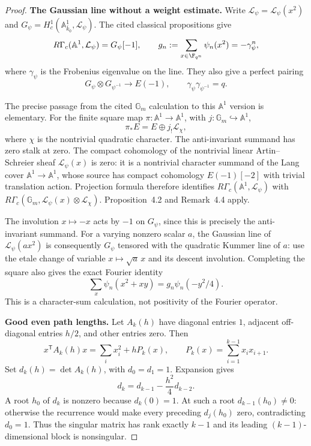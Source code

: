 \documentclass[11pt,a4paper]{article}
\newcommand{\A}{\mathbb A}\newcommand{\PP}{\mathbb P}\newcommand{\GL}{\mathrm{GL}}
\newcommand{\mathscr}{\mathcal}
\theoremstyle{named}\newtheorem{finding}{Finding}[section]
\theoremstyle{definition}\newtheorem{definition}[finding]{Definition}
\theoremstyle{remark}\newtheorem{remark}[finding]{Remark}
\begin{document}
\begin{proof}
\par\smallskip\noindent\textbf{The Gaussian line without a weight estimate.}\quad
Write $\mathscr L_\psi=\mathcal L_\psi(x^2)$ and
$G_\psi=H_c^1(\A^1_{\bar k_0},\mathscr L_\psi)$.
The cited classical propositions give
\begin{equation}\label{eq:gaussline}
 R\Gamma_c(\A^1,\mathscr L_\psi)=G_\psi[-1],
 \qquad
 g_n:=\sum_{x\in\F_{q^n}}\psi_n(x^2)=-\gamma_\psi^n,
\end{equation}
where $\gamma_\psi$ is the Frobenius eigenvalue on the line.
They also give a perfect pairing
\begin{equation}\label{eq:gausspair}
 G_\psi\otimes G_{\psi^{-1}}\longrightarrow E(-1),
 \qquad \gamma_\psi\gamma_{\psi^{-1}}=q.
\end{equation}

The precise passage from the cited $\mathbb G_m$ calculation to this
$\A^1$ version is elementary. For the finite square map
$\pi:\A^1\to\A^1$, with $j:\mathbb G_m\hookrightarrow\A^1$,
\[
 \pi_*E=E\oplus j_!\mathcal L_\chi,
\]
where $\chi$ is the nontrivial quadratic character. The
anti-invariant summand has zero stalk at zero. The compact
cohomology of the nontrivial linear Artin--Schreier sheaf
$\mathcal L_\psi(x)$ is zero: it is a nontrivial character
summand of the Lang cover $\A^1\to\A^1$, whose source has
compact cohomology $E(-1)[-2]$ with trivial translation action.
Projection formula therefore identifies
$R\Gamma_c(\A^1,\mathscr L_\psi)$ with
$R\Gamma_c(\mathbb G_m,\mathcal L_\psi(x)\otimes\mathcal L_\chi)$.
Proposition~4.2 and Remark~4.4 apply.

The involution $x\mapsto-x$ acts by $-1$ on $G_\psi$,
since this is precisely the anti-invariant summand. For a
varying nonzero scalar $a$, the Gaussian line of
$\mathcal L_\psi(ax^2)$ is consequently $G_\psi$ tensored with
the quadratic Kummer line of $a$: use the etale change of
variable $x\mapsto\sqrt a\,x$ and its descent involution.
Completing the square also gives the exact Fourier identity
\[
 \sum_x\psi_n(x^2+xy)=g_n\psi_n(-y^2/4).
\]
This is a character-sum calculation, not positivity of the
Fourier operator.

\par\smallskip\noindent\textbf{Good even path lengths.}\quad
Let $A_k(h)$ have diagonal entries $1$, adjacent off-diagonal
entries $h/2$, and other entries zero. Then
\[
 x^{\mathsf T}A_k(h)x=\sum_i x_i^2+hP_k(x),\qquad
 P_k(x)=\sum_{i=1}^{k-1}x_ix_{i+1}.
\]
Set $d_k(h)=\det A_k(h)$, with $d_0=d_1=1$. Expansion gives
\begin{equation}\label{eq:gaussdetrec}
 d_k=d_{k-1}-\frac{h^2}{4}d_{k-2}.
\end{equation}
A root $h_0$ of $d_k$ is nonzero because $d_k(0)=1$.
At such a root $d_{k-1}(h_0)\ne0$: otherwise the recurrence
would make every preceding $d_j(h_0)$ zero, contradicting
$d_0=1$. Thus the singular matrix has rank exactly $k-1$
and its leading $(k-1)$-dimensional block is nonsingular.


\end{proof}
\end{document}
